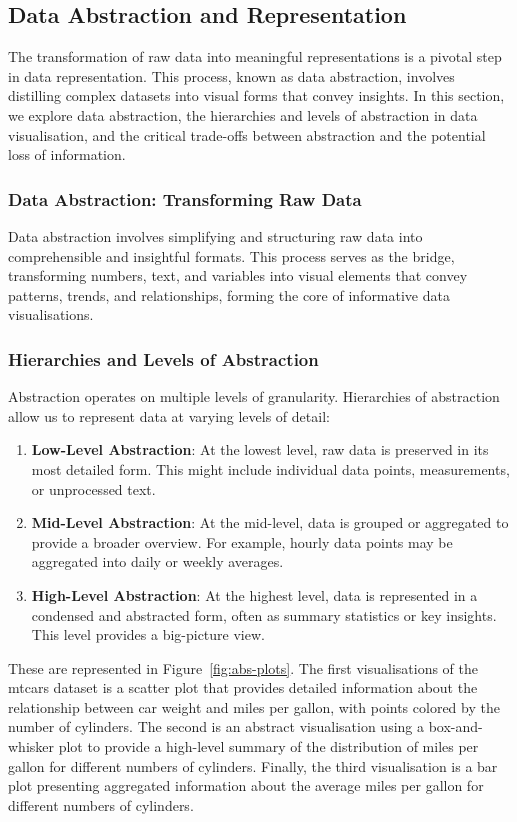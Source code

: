 \documentclass{article}\usepackage[]{graphicx}\usepackage[]{xcolor}
\begin{document}
\subsection{Data Abstraction and Representation}
The transformation of raw data into meaningful representations is a pivotal step in data representation. This process, known as data abstraction, involves distilling complex datasets into visual forms that convey insights. In this section, we explore data abstraction, the hierarchies and levels of abstraction in data visualisation, and the critical trade-offs between abstraction and the potential loss of information.

\subsubsection{Data Abstraction: Transforming Raw Data}
Data abstraction involves simplifying and structuring raw data into comprehensible and insightful formats. This process serves as the bridge, transforming numbers, text, and variables into visual elements that convey patterns, trends, and relationships, forming the core of informative data visualisations.

\subsubsection{Hierarchies and Levels of Abstraction}
Abstraction operates on multiple levels of granularity. Hierarchies of abstraction allow us to represent data at varying levels of detail: 
\begin{enumerate}
    \item \textbf{Low-Level Abstraction}: At the lowest level, raw data is preserved in its most detailed form. This might include individual data points, measurements, or unprocessed text.
    \item \textbf{Mid-Level Abstraction}: At the mid-level, data is grouped or aggregated to provide a broader overview. For example, hourly data points may be aggregated into daily or weekly averages.
    \item \textbf{High-Level Abstraction}: At the highest level, data is represented in a condensed and abstracted form, often as summary statistics or key insights. This level provides a big-picture view.
\end{enumerate}

\noindent 
These are represented in Figure~\ref{fig:abs-plots}. The first visualisations of the mtcars dataset is a scatter plot that provides detailed information about the relationship between car weight and miles per gallon, with points colored by the number of cylinders. The second is an abstract visualisation using a box-and-whisker plot to provide a high-level summary of the distribution of miles per gallon for different numbers of cylinders. Finally, the third visualisation is a bar plot presenting aggregated information about the average miles per gallon for different numbers of cylinders.
\end{document}
